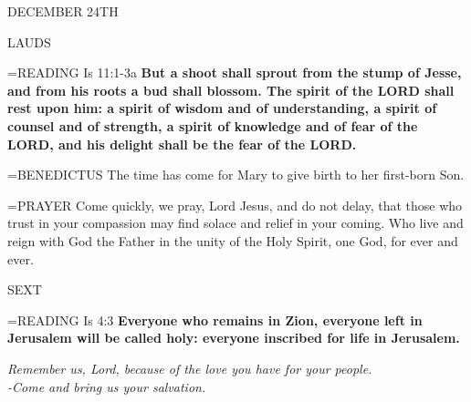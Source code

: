 \begin{center}\normalsize DECEMBER 24TH\\
\end{center}

\begin{flushleft}\normalsize LAUDS\\\end{flushleft}

\hangindent=\parindent \small{READING} Is 11:1-3a \textbf{But a shoot shall sprout from the stump of Jesse, and from his roots a bud shall blossom. The spirit of the LORD shall rest upon him: a spirit of wisdom and of understanding, a spirit of counsel and of strength, a spirit of knowledge and of fear of the LORD, and his delight shall be the fear of the LORD.\\}

\hangindent=\parindent \small{BENEDICTUS  The time has come for Mary to give birth to her first-born Son.\\}

\hangindent=\parindent \small{PRAYER  Come quickly, we pray, Lord Jesus, and do not delay, that those who trust in your compassion may find solace and relief in your coming. Who live and reign with God the Father in the unity of the Holy Spirit, one God, for ever and ever.}

\begin{flushleft}\normalsize SEXT\\\end{flushleft}

\hangindent=\parindent \small{READING} Is 4:3 \textbf{Everyone who remains in Zion, everyone left in Jerusalem will be called holy: everyone inscribed for life in Jerusalem.}

\begin{center}
\textit{Remember us, Lord, because of the love you have for your people.\\
-Come and bring us your salvation.}
\end{center}

